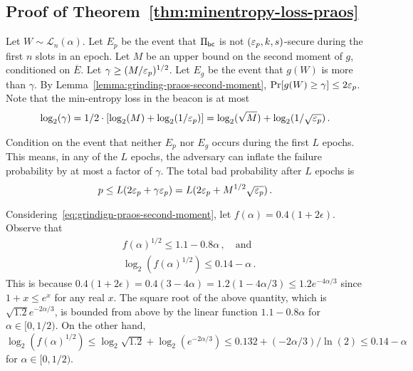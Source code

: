 \subsection{Proof of Theorem~\ref{thm:minentropy-loss-praos}}

Let $W \sim \mathcal{L}_n(\alpha)$. 
Let $E_p$ be the event that 
$\Pi_\mathsf{bc}$ is not $(\mathsf{\varepsilon}_p, k, s)$-secure during 
the first $n$ slots in an epoch. 
Let $M$ be an upper bound on the second moment of $g$, 
conditioned on $\overline{E}$. 
Let $\gamma \geq (M/\mathsf{\varepsilon}_p)^{1/2}$. 
Let $E_g$ be the event that $g(W)$ is more than $\gamma$.
By Lemma~\ref{lemma:grinding-praos-second-moment}, 
$\Pr[g(W) \geq \gamma] \leq 2 \mathsf{\varepsilon}_p$. 
Note that the min-entropy loss in the beacon is at most 
\begin{equation}\label{eq:log-gamma}
 \log_2(\gamma) 
 = 1/2 \cdot [\log_2(M) + \log_2(1/\mathsf{\varepsilon}_p)]
 = \log_2(\sqrt{M}) + \log_2(1/\sqrt{\mathsf{\varepsilon}_p})
 \,. 
\end{equation}


Condition on the event that neither $E_p$ nor $E_g$ 
occurs during the first $L$ epochs. 
This means, in any of the $L$ epochs, 
the adversary can inflate the failure probability 
by at most a factor of $\gamma$.
The total bad probability after $L$ epochs is
$$
  p
  \leq L (2 \mathsf{\varepsilon}_p + \gamma \mathsf{\varepsilon}_p)
  = L (2 \mathsf{\varepsilon}_p + M^{1/2} \sqrt{\mathsf{\varepsilon}_p})
  \,.
$$

Considering~\eqref{eq:grindign-praos-second-moment}, 
let $f(\alpha) = 0.4 (1 + 2\epsilon)$. 
Observe that 
\begin{align*}
  &f(\alpha)^{1/2} \leq 1.1 - 0.8 \alpha\,,
  \quad\text{and}\\
  &\log_2 (f(\alpha)^{1/2}) \leq 
  0.14 - \alpha
  \,.  
\end{align*}
This is because $0.4 (1+2\epsilon) 
= 0.4 (3 - 4\alpha) 
= 1.2 (1 - 4\alpha/3) 
\leq 1.2 e^{-4\alpha/3}$ 
since $1 + x \leq e^x$ for any real $x$. 
The square root of the above quantity, which is $\sqrt{1.2} e^{-2\alpha/3}$, 
is bounded from above by the linear function 
$1.1 - 0.8 \alpha$ for $\alpha \in [0,  1/2)$. 
On the other hand, 
$\log_2 (f(\alpha)^{1/2})
\leq \log_2 \sqrt{1.2} + \log_2(e^{-2\alpha/3})
\leq 0.132 + (-2\alpha/3)/\ln(2)
\leq  0.14 - \alpha
$
for $\alpha \in [0, 1/2)$. 

